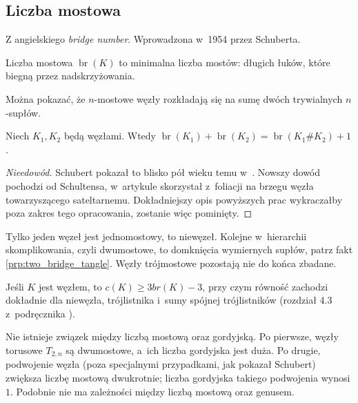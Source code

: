 
\subsection{Liczba mostowa} %
\label{sub:bridge_index}
Z angielskiego \emph{bridge number}.
Wprowadzona w~1954 przez Schuberta.
\begin{definition}
    Liczba mostowa $\operatorname{br}(K)$ to minimalna liczba mostów:
    długich łuków, które biegną przez nadskrzyżowania.
\end{definition}

Można pokazać, że $n$-mostowe węzły rozkładają się na sumę dwóch trywialnych $n$-supłów.

\begin{proposition}
    \label{bridge_additive}
    Niech $K_1, K_2$ będą węzłami.
    Wtedy $\operatorname{br} (K_1) + \operatorname{br}(K_2) = \operatorname{br}(K_1 \# K_2) + 1$.
\end{proposition}

\begin{proof}[Nieedowód]
    Schubert pokazał to blisko pół wieku temu w~\cite{schubert54}.
    Nowszy dowód pochodzi od Schultensa, w~artykule \cite{schultens03} skorzystał z~foliacji na brzegu węzła towarzyszącego sateltarnemu.
    Dokładniejszy opis powyższych prac wykraczałby poza zakres tego opracowania, zostanie więc pominięty.
\end{proof}

Tylko jeden węzeł jest jednomostowy, to niewęzeł.
Kolejne w~hierarchii skomplikowania, czyli dwumostowe,
to domknięcia wymiernych supłów, patrz fakt \ref{prp:two_bridge_tangle}.
Węzły trójmostowe pozostają nie do końca zbadane.

\begin{conjecture}
    Jeśli $K$ jest węzłem, to $c(K) \ge 3 br(K) - 3$, przy czym równość zachodzi dokładnie dla niewęzła, trójlistnika i~sumy spójnej trójlistników (rozdział 4.3 z~podręcznika \cite{murasugi96}).
\end{conjecture}

Nie istnieje związek między liczbą mostową oraz gordyjską.
Po pierwsze, węzły torusowe $T_{2,n}$ są dwumostowe, a~ich liczba gordyjska jest duża.
Po drugie, podwojenie węzła (poza specjalnymi przypadkami, jak pokazał Schubert) zwiększa liczbę mostową dwukrotnie; liczba gordyjska takiego podwojenia wynosi $1$.
Podobnie nie ma zależności między liczbą mostową oraz genusem.

